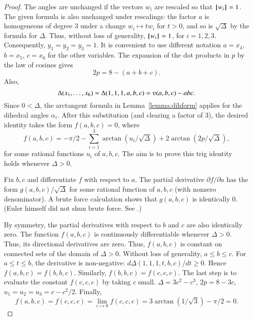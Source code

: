 \begin{proof}
The angles are unchanged if the vectors $w_i$ are rescaled so that
${{\hskip0.1em|\hskip-0.15em|\hskip0.1em}w_i{\hskip0.1em|\hskip-0.15em|\hskip0.1em}}=1$.  The given formula is also unchanged under rescalings:
the factor $a$ is homogeneous of degree $3$ under a change $w_i
\mapsto t w_i$ for $t>0$, and so is $\sqrt{\Delta}$ by the
formula for $\Delta$.  Thus, without loss of generality, ${{\hskip0.1em|\hskip-0.15em|\hskip0.1em}w_i{\hskip0.1em|\hskip-0.15em|\hskip0.1em}}=1$, for
$i=1,2,3$.  Consequently, $y_1=y_2=y_3=1$.  It is convenient to use
different notation $a=x_4$, $b=x_5$, $c=x_6$ for the other
variables. The expansion of the dot products in $p$ by the law of cosines
gives
    $$2 p = 8 - (a+b+c).$$
Also, $$\Delta(x_1,\ldots,x_6) = \Delta(1,1,1,a,b,c) =
    \ups(a,b,c) - a b c.$$
Since $0 <\Delta$, the arctangent formula
in Lemma~\ref{lemma:dihform} 
applies for the dihedral angles $\alpha_i$.  After
this substitution (and clearing a factor of $3$),  %
the desired identity takes the form $f(a,b,c)=0$, where
    $$
    f(a,b,c)= -\pi/2 - \sum_{i=1}^3\arctan(u_i/\sqrt{\Delta}) +
    2\arctan(2 p/\sqrt{\Delta}),
    $$
for some rational functions $u_i$ of $a,b,c$.   The aim is to prove this trig identity holds whenever $\Delta>0$.

Fix $b,c$ and differentiate $f$ with respect
to $a$.  The partial derivative $\partial f/\partial a$ has the form
$g(a,b,c)/\sqrt{\Delta}$ for some rational function of $a,b,c$ (with
nonzero denominator).  A brute force calculation shows that $g(a,b,c)$ is
identically $0$.  (Euler himself did not shun brute force.  See
\cite{Euler}.)

By symmetry, the partial derivatives with respect to $b$ and $c$ are
also identically zero.  The function $f(a,b,c)$  is continuously
differentiable whenever $\Delta>0$.  Thus, its directional
derivatives are zero.  Thus, $f(a,b,c)$ is constant on connected
sets of the domain of $\Delta>0$.  Without loss of generality, $a\le b\le c$.  For $a\le t\le b$,  the derivative is non-negative:
$d\Delta(1,1,1,t,b,c)/dt\ge 0$. Hence $f(a,b,c)=f(b,b,c)$. 
Similarly,
 $f(b,b,c)=f(c,c,c)$. 
The last step is to evaluate the constant $f(c,c,c)$
by taking $c$ small.
$\Delta=3c^2-c^3$, $2p= 8-3c$,  $u_1=u_2=u_3 = c -c^2/2$.   Finally,
    $$f(a,b,c)= f(c,c,c) = \lim_{c\mapsto0} f(c,c,c) = 
    3 \arctan(1/\sqrt3)-\pi/2 =0.$$
\end{proof}






